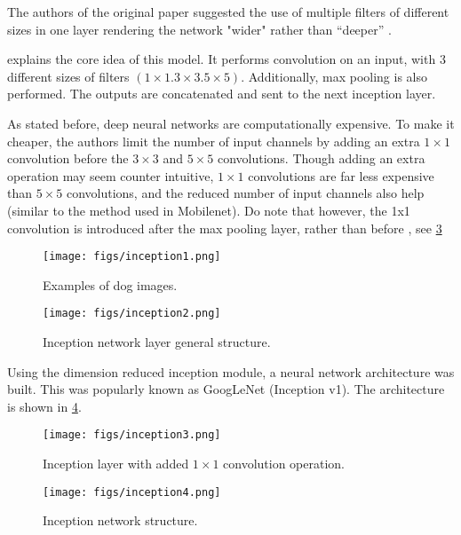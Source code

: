 The authors of the original paper suggested the use of multiple filters of different sizes in one layer rendering the network "wider" rather than “deeper” \cite{b7}.

 explains the core idea of this model. It performs convolution on an input, with 3 different sizes of filters $(1 \times 1.3 \times 3.5 \times 5)$. Additionally, max pooling is also performed. The outputs are concatenated and sent to the next inception layer.

As stated before, deep neural networks are computationally expensive. To make it cheaper, the authors limit the number of input channels by adding an extra $1 \times 1$ convolution before the $3 \times 3$ and $5 \times 5$ convolutions. Though adding an extra operation may seem counter intuitive, $1 \times 1$ convolutions are far less expensive than $5 \times 5$ convolutions, and the reduced number of input channels also help (similar to the method used in Mobilenet). Do note that however, the 1x1 convolution is introduced after the max pooling layer, rather than before \cite{b12}, see \cref{fig:inception3}


\begin{figure}[ht]
	\centering
	\texttt{[image: figs/inception1.png]}
	\caption{Examples of dog images.}\label{fig:inception1}
\end{figure}

\begin{figure}[ht]
	\centering
	\texttt{[image: figs/inception2.png]}
	\caption{Inception network layer general structure.}\label{fig:inception2}
\end{figure}

Using the dimension reduced inception module, a neural network architecture was built. This was popularly known as GoogLeNet (Inception v1). The architecture is shown in \cref{fig:inception4}.

\begin{figure}[ht]
	\centering
	\texttt{[image: figs/inception3.png]}
	\caption{Inception layer with added $1 \times 1$ convolution operation.}\label{fig:inception3}
\end{figure}

\begin{figure}[ht]
	\centering
	\texttt{[image: figs/inception4.png]}
	\caption{Inception network structure.}\label{fig:inception4}
\end{figure}

